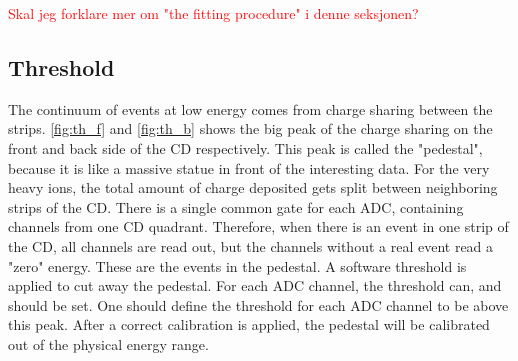 \documentclass[twoside,english]{uiofysmaster/uiofysmaster}
\let\orgautoref\autoref
\renewcommand{\autoref}
        {%
		 \def\sectionautorefname{Section}%
		 \def\subsectionautorefname{Section}%
		 \def\subsubsectionautorefname{Section}%
		 \def\chapterautorefname{Chapter}%
          \orgautoref}
\begin{document}
\bigskip

\textcolor{red}{Skal jeg forklare mer om "the fitting procedure" i denne seksjonen?}



\subsection{Threshold}\label{ssec:threshold}
The continuum of events at low energy comes from charge sharing between the strips.
\autoref{fig:th_f} and \autoref{fig:th_b} shows the big peak of the charge sharing on the front and back side of the CD respectively. 
This peak is called the "pedestal", because it is like a massive statue in front of the interesting data. 
For the very heavy ions, the total amount of charge deposited gets split between neighboring strips of the CD. 
There is a single common gate for each ADC, containing channels from one CD quadrant. 
Therefore, when there is an event in one strip of the CD, all channels are read out, but the channels without a real event read a "zero" energy.
These are the events in the pedestal.
A software threshold is applied to cut away the pedestal. 
For each ADC channel, the threshold can, and should be set. 
One should define the threshold for each ADC channel to be above this peak.
After a correct calibration is applied, the pedestal will be calibrated out of the physical energy range.

\end{document}
